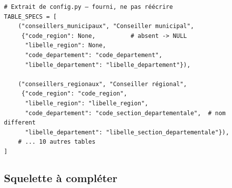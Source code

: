 \documentclass[11pt,a4paper]{article}
\begin{document}
\begin{lstlisting}
# Extrait de config.py — fourni, ne pas réécrire
TABLE_SPECS = [
    ("conseillers_municipaux", "Conseiller municipal",
     {"code_region": None,          # absent -> NULL
      "libelle_region": None,
      "code_departement": "code_departement",
      "libelle_departement": "libelle_departement"}),

    ("conseillers_regionaux", "Conseiller régional",
     {"code_region": "code_region",
      "libelle_region": "libelle_region",
      "code_departement": "code_section_departementale",  # nom different
      "libelle_departement": "libelle_section_departementale"}),
    # ... 10 autres tables
]
\end{lstlisting}

\subsection*{Squelette à compléter}
\end{document}
